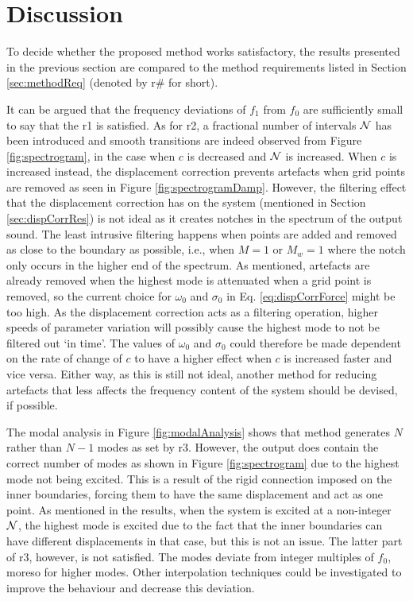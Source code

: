 \section{Discussion}
To decide whether the proposed method works satisfactory, the results presented in the previous section are compared to the method requirements listed in Section \ref{sec:methodReq} (denoted by r\# for short). 

It can be argued that the frequency deviations of $f_1$ from $f_0$ are sufficiently small to say that the r1 is satisfied. As for r2, a fractional number of intervals $\mathcal{N}$ has been introduced and smooth transitions are indeed observed from Figure \ref{fig:spectrogram}, in the case when $c$ is decreased and $\mathcal{N}$ is increased. When $c$ is increased instead, the displacement correction prevents artefacts when grid points are removed as seen in Figure \ref{fig:spectrogramDamp}. However, the filtering effect that the displacement correction has on the system (mentioned in Section \ref{sec:dispCorrRes}) is not ideal as it creates notches in the spectrum of the output sound. The least intrusive filtering happens when points are added and removed as close to the boundary as possible, i.e., when $M = 1$ or $M_w = 1$ where the notch only occurs in the higher end of the spectrum. As mentioned, artefacts are already removed when the highest mode is attenuated when a grid point is removed, so the current choice for $\omega_0$ and $\sigma_0$ in Eq. \eqref{eq:dispCorrForce} might be too high. As the displacement correction acts as a filtering operation, higher speeds of parameter variation will possibly cause the highest mode to not be filtered out `in time'. The values of $\omega_0$ and $\sigma_0$ could therefore be made dependent on the rate of change of $c$ to have a higher effect when $c$ is increased faster and vice versa.
Either way, as this is still not ideal, another method for reducing artefacts that less affects the frequency content of the system should be devised, if possible. 

The modal analysis in Figure \ref{fig:modalAnalysis} shows that method generates $N$ rather than $N - 1$ modes as set by r3. However, the output does contain the correct number of modes as shown in Figure \ref{fig:spectrogram} due to the highest mode not being excited. This is a result of the rigid connection imposed on the inner boundaries, forcing them to have the same displacement and act as one point. As mentioned in the results, when the system is excited at a non-integer $\mathcal{N}$, the highest mode is excited due to the fact that the inner boundaries can have different displacements in that case, but this is not an issue.
%
The latter part of r3, however, is not satisfied. The modes deviate from integer multiples of $f_0$, moreso for higher modes. Other interpolation techniques could be investigated to improve the behaviour and decrease this deviation.

